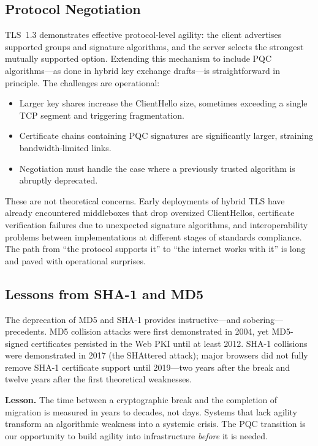 \subsection{Protocol Negotiation}
\label{subsec:protocol-negotiation}

TLS~1.3 demonstrates effective protocol-level agility: the client advertises supported groups and signature algorithms, and the server selects the strongest mutually supported option.  Extending this mechanism to include PQC algorithms---as done in hybrid key exchange drafts---is straightforward in principle.  The challenges are operational:
\begin{itemize}
\item Larger key shares increase the ClientHello size, sometimes exceeding a single TCP segment and triggering fragmentation.
\item Certificate chains containing PQC signatures are significantly larger, straining bandwidth-limited links.
\item Negotiation must handle the case where a previously trusted algorithm is abruptly deprecated.
\end{itemize}

These are not theoretical concerns.  Early deployments of hybrid TLS have already encountered middleboxes that drop oversized ClientHellos, certificate verification failures due to unexpected signature algorithms, and interoperability problems between implementations at different stages of standards compliance.  The path from ``the protocol supports it'' to ``the internet works with it'' is long and paved with operational surprises.

\subsection{Lessons from SHA-1 and MD5}
\label{subsec:sha1-lessons}

The deprecation of MD5 and SHA-1 provides instructive---and sobering---precedents.  MD5 collision attacks were first demonstrated in 2004, yet MD5-signed certificates persisted in the Web PKI until at least 2012.  SHA-1 collisions were demonstrated in 2017 (the SHAttered attack); major browsers did not fully remove SHA-1 certificate support until 2019---two years after the break and twelve years after the first theoretical weaknesses.

\begin{svgraybox}
\textbf{Lesson.}
The time between a cryptographic break and the completion of migration is measured in years to decades, not days.  Systems that lack agility transform an algorithmic weakness into a systemic crisis.  The PQC transition is our opportunity to build agility into infrastructure \emph{before} it is needed.
\end{svgraybox}

